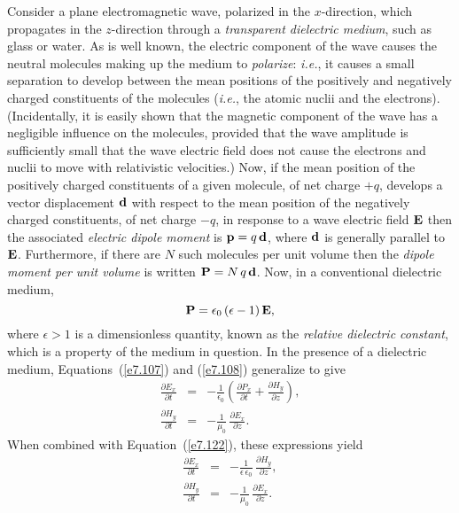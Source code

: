 Consider a plane electromagnetic wave, polarized in the $x$-direction, which
 propagates in the $z$-direction through a {\em transparent dielectric medium}, such as glass or water. As is well known, the electric component of the wave causes the neutral molecules making
up the medium to {\em polarize}: {\em i.e.}, it causes a small separation to develop between the mean positions of the positively
and negatively charged constituents of the molecules ({\em i.e.}, the atomic nuclii and the
electrons). (Incidentally, it is easily
shown that the magnetic component of the wave has a negligible influence on the 
molecules, provided that the wave amplitude is sufficiently small that the wave electric
field does not cause the electrons and nuclii to move with relativistic velocities.) Now, if the mean position of the positively charged
constituents  of a given molecule, of net charge $+q$, develops a vector displacement
${\bf d}$ with respect to the mean position of the negatively charged constituents, of net charge $-q$, in response to a wave electric field ${\bf E}$ then the
associated {\em electric dipole moment}\/ is ${\bf p} = q\,{\bf d}$, where
${\bf d}$ is generally parallel to ${\bf E}$.  Furthermore, if there are $N$
such molecules per unit volume then the {\em dipole moment per unit volume}\/
is written ${\bf P} = N\,q\,{\bf d}$. Now, in a conventional dielectric medium,
\begin{equation}\label{e7.122}
{\bf P} = \epsilon_0\,(\epsilon-1)\,{\bf E},
\end{equation}
where $\epsilon>1$ is a dimensionless quantity, known as the {\em relative dielectric
constant}, which is a property of the medium in question. In the presence of a
dielectric medium, Equations~(\ref{e7.107}) and (\ref{e7.108}) generalize to give
\begin{eqnarray}
\frac{\partial E_x}{\partial t} &=& - \frac{1}{\epsilon_0}\left(\frac{\partial P_x}{\partial t}+\frac{\partial H_y}{\partial z}\right),\\[0.5ex]
\frac{\partial H_y}{\partial t} &=& -\frac{1}{\mu_0}\,\frac{\partial E_x}{\partial z}.
\end{eqnarray}
When combined with Equation~(\ref{e7.122}), these expressions yield
\begin{eqnarray}
\frac{\partial E_x}{\partial t} &=& - \frac{1}{\epsilon\,\epsilon_0}\,\frac{\partial H_y}{\partial z},\\[0.5ex]
\frac{\partial H_y}{\partial t} &=& -\frac{1}{\mu_0}\,\frac{\partial E_x}{\partial z}.
\end{eqnarray}
